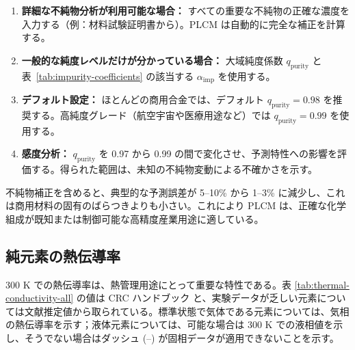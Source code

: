 \documentclass[11pt,a4paper]{article}
\theoremstyle{remark}
\begin{document}
	\begin{enumerate}
		\item \textbf{詳細な不純物分析が利用可能な場合：} すべての重要な不純物の正確な濃度を入力する（例：材料試験証明書から）。PLCM は自動的に完全な補正を計算する。
		\item \textbf{一般的な純度レベルだけが分かっている場合：} 大域純度係数 \(q_{\mathrm{purity}}\) と表~\ref{tab:impurity-coefficients} の該当する \(\alpha_{\mathrm{imp}}\) を使用する。
		\item \textbf{デフォルト設定：} ほとんどの商用合金では、デフォルト \(q_{\mathrm{purity}} = 0.98\) を推奨する。高純度グレード（航空宇宙や医療用途など）では \(q_{\mathrm{purity}} = 0.99\) を使用する。
		\item \textbf{感度分析：} \(q_{\mathrm{purity}}\) を 0.97 から 0.99 の間で変化させ、予測特性への影響を評価する。得られた範囲は、未知の不純物変動による不確かさを示す。
	\end{enumerate}
	
	不純物補正を含めると、典型的な予測誤差が 5–10\% から 1–3\% に減少し、これは商用材料の固有のばらつきよりも小さい。これにより PLCM は、正確な化学組成が既知または制御可能な高精度産業用途に適している。
	
	\subsection{純元素の熱伝導率}
	\label{subsec:thermal-conductivity-elements}
	
	300 K での熱伝導率は、熱管理用途にとって重要な特性である。表 \ref{tab:thermal-conductivity-all} の値は CRC ハンドブック \cite{CRC} と、実験データが乏しい元素については文献推定値から取られている。標準状態で気体である元素については、気相の熱伝導率を示す；液体元素については、可能な場合は 300 K での液相値を示し、そうでない場合はダッシュ (–) が固相データが適用できないことを示す。
	
\end{document}
